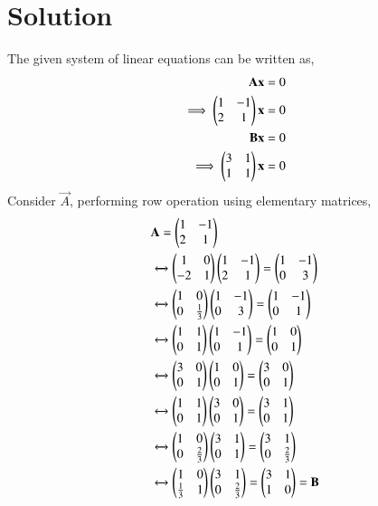 \documentclass[journal,12pt,twocolumn]{IEEEtran}
\begin{document}
\section{Solution}
The given system of linear equations can be written as,   
\begin{align}
    \mathbf{A}\mathbf{x} &= 0 \label{ax=0}\\
    \implies\begin{pmatrix}1&-1\\2&1\end{pmatrix}\mathbf{x} &= 0 \\
    \mathbf{B}\mathbf{x} &= 0 \label{bx=0}\\
    \implies\begin{pmatrix}3&1\\1&1\end{pmatrix}\mathbf{x} &= 0
\end{align}
Consider $\vec{A}$, performing row operation using elementary matrices, 
\begin{align}
    &\mathbf{A} = \begin{pmatrix}1&-1\\2&1\end{pmatrix} \\
    &\xleftrightarrow{}\begin{pmatrix}1&0\\-2&1\end{pmatrix}\begin{pmatrix}1&-1\\2&1\end{pmatrix} = \begin{pmatrix}1&-1\\0&3\end{pmatrix} \\
    &\xleftrightarrow{}\begin{pmatrix}1&0\\0&\frac{1}{3}\end{pmatrix}\begin{pmatrix}1&-1\\0&3\end{pmatrix} = \begin{pmatrix}1&-1\\0&1\end{pmatrix} \\
    &\xleftrightarrow{}\begin{pmatrix}1&1\\0&1\end{pmatrix}\begin{pmatrix}1&-1\\0&1\end{pmatrix} = \begin{pmatrix}1&0\\0&1\end{pmatrix}\\
    &\xleftrightarrow{}\begin{pmatrix}3&0\\0&1\end{pmatrix}\begin{pmatrix}1&0\\0&1\end{pmatrix} = \begin{pmatrix}3&0\\0&1\end{pmatrix} \\
    &\xleftrightarrow{}\begin{pmatrix}1&1\\0&1\end{pmatrix}\begin{pmatrix}3&0\\0&1\end{pmatrix} = \begin{pmatrix}3&1\\0&1\end{pmatrix} \\
    &\xleftrightarrow{}\begin{pmatrix}1&0\\0&\frac{2}{3}\end{pmatrix}\begin{pmatrix}3&1\\0&1\end{pmatrix} = \begin{pmatrix}3&1\\0&\frac{2}{3}\end{pmatrix} \\
    &\xleftrightarrow{}\begin{pmatrix}1&0\\\frac{1}{3}&1\end{pmatrix}\begin{pmatrix}3&1\\0&\frac{2}{3}\end{pmatrix} = \begin{pmatrix}3&1\\1&0\end{pmatrix} = \mathbf{B}
\end{align}
\end{document}
